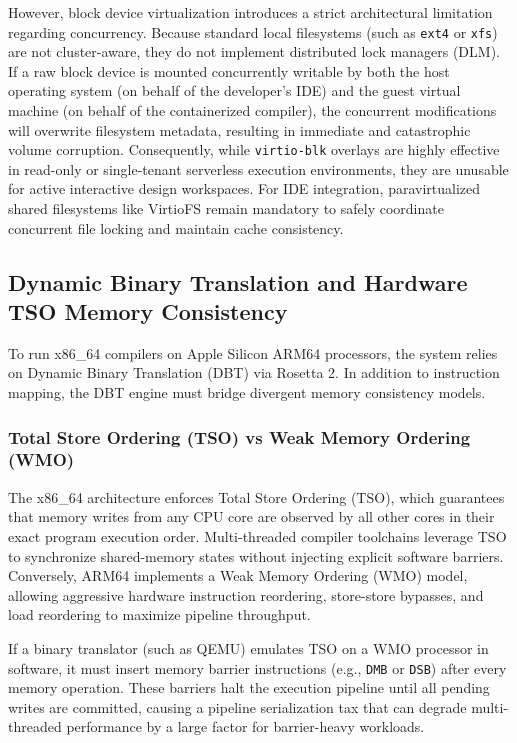 However, block device virtualization introduces a strict architectural limitation regarding concurrency. Because standard local filesystems (such as \texttt{ext4} or \texttt{xfs}) are not cluster-aware, they do not implement distributed lock managers (DLM). If a raw block device is mounted concurrently writable by both the host operating system (on behalf of the developer's IDE) and the guest virtual machine (on behalf of the containerized compiler), the concurrent modifications will overwrite filesystem metadata, resulting in immediate and catastrophic volume corruption. Consequently, while \texttt{virtio-blk} overlays are highly effective in read-only or single-tenant serverless execution environments, they are unusable for active interactive design workspaces. For IDE integration, paravirtualized shared filesystems like VirtioFS remain mandatory to safely coordinate concurrent file locking and maintain cache consistency.

\subsection{Dynamic Binary Translation and Hardware TSO Memory Consistency}
To run x86\_64 compilers on Apple Silicon ARM64 processors, the system relies on Dynamic Binary Translation (DBT) via Rosetta 2. In addition to instruction mapping, the DBT engine must bridge divergent memory consistency models.

\subsubsection{Total Store Ordering (TSO) vs Weak Memory Ordering (WMO)}
The x86\_64 architecture enforces Total Store Ordering (TSO), which guarantees that memory writes from any CPU core are observed by all other cores in their exact program execution order. Multi-threaded compiler toolchains leverage TSO to synchronize shared-memory states without injecting explicit software barriers. Conversely, ARM64 implements a Weak Memory Ordering (WMO) model, allowing aggressive hardware instruction reordering, store-store bypasses, and load reordering to maximize pipeline throughput.

If a binary translator (such as QEMU) emulates TSO on a WMO processor in software, it must insert memory barrier instructions (e.g., \texttt{DMB} or \texttt{DSB}) after every memory operation. These barriers halt the execution pipeline until all pending writes are committed, causing a pipeline serialization tax that can degrade multi-threaded performance by a large factor for barrier-heavy workloads.

